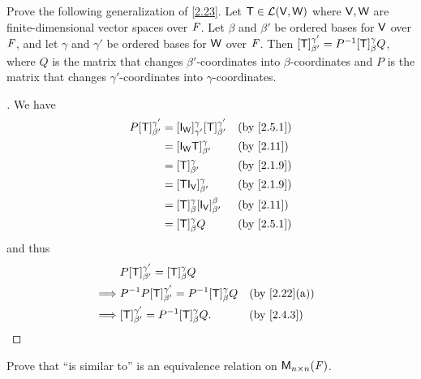 \exercisesection

\setcounter{ex}{7}
\begin{ex}\label{ex:2.5.8}
  Prove the following generalization of \cref{2.23}.
  Let \(\mathsf{T} \in \mathcal{L}(\mathsf{V}, \mathsf{W})\) where \(\mathsf{V}, \mathsf{W}\) are finite-dimensional vector spaces over \(\mathit{F}\).
  Let \(\beta\) and \(\beta'\) be ordered bases for \(\mathsf{V}\) over \(\mathit{F}\), and let \(\gamma\) and \(\gamma'\) be ordered bases for \(\mathsf{W}\) over \(\mathit{F}\).
  Then \([\mathsf{T}]_{\beta'}^{\gamma'} = P^{-1} [\mathsf{T}]_{\beta}^{\gamma} Q\), where \(Q\) is the matrix that changes \(\beta'\)-coordinates into \(\beta\)-coordinates and \(P\) is the matrix that changes \(\gamma'\)-coordinates into \(\gamma\)-coordinates.
\end{ex}

\begin{proof}[]
  We have
  \begin{align*}
    P [\T]_{\beta'}^{\gamma'} & = [\IT[\W]]_{\gamma'}^{\gamma} [\T]_{\beta'}^{\gamma'} &  & \text{(by \cref{2.5.1})} \\
                              & = [\IT[\W] \T]_{\beta'}^{\gamma}                       &  & \text{(by \cref{2.11})}  \\
                              & = [\T]_{\beta'}^{\gamma}                               &  & \text{(by \cref{2.1.9})} \\
                              & = [\T \IT[\V]]_{\beta'}^{\gamma}                       &  & \text{(by \cref{2.1.9})} \\
                              & = [\T]_{\beta}^{\gamma} [\IT[\V]]_{\beta'}^{\beta}     &  & \text{(by \cref{2.11})}  \\
                              & = [\T]_{\beta}^{\gamma} Q                              &  & \text{(by \cref{2.5.1})}
  \end{align*}
  and thus
  \begin{align*}
             & P [\T]_{\beta'}^{\gamma'} = [\T]_{\beta}^{\gamma} Q                                               \\
    \implies & P^{-1} P [\T]_{\beta'}^{\gamma'} = P^{-1} [\T]_{\beta}^{\gamma} Q &  & \text{(by \cref{2.22}(a))} \\
    \implies & [\T]_{\beta'}^{\gamma'} = P^{-1} [\T]_{\beta}^{\gamma} Q.         &  & \text{(by \cref{2.4.3})}
  \end{align*}
\end{proof}

\begin{ex}\label{ex:2.5.9}
  Prove that ``is similar to'' is an equivalence relation on \(\mathsf{M}_{{n} \times n}({\mathit{F}})\).
\end{ex}


